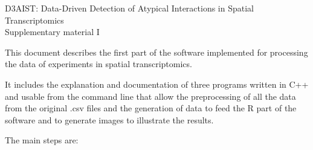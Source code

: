 \documentclass[11pt]{report}
\begin{document}
{\Large
\begin{center}
D3AIST: Data-Driven Detection of Atypical Interactions in Spatial Transcriptomics\\
Supplementary material I\\
\end{center}
}

This document describes the first part of the software implemented for processing the data of experiments in spatial transcriptomics.

It includes the explanation and documentation of three programs written in C++ and usable from the command line that allow the preprocessing
of all the data from the original .csv files and the generation of data to feed the R part of the software and to generate images to
illustrate the results.

The main steps are:
\end{document}
